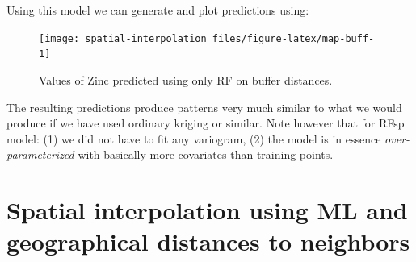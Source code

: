 \documentclass[
  graybox,natbib,nospthms]{svmono}
\newenvironment{Shaded}{\begin{snugshade}}{\end{snugshade}}
\newcommand{\AttributeTok}[1]{\textcolor[rgb]{0.61,0.61,0.61}{#1}}
\newcommand{\ConstantTok}[1]{\textcolor[rgb]{0,0,0}{#1}}
\newcommand{\DecValTok}[1]{\textcolor[rgb]{0.06,0.06,0.06}{#1}}
\newcommand{\FunctionTok}[1]{\textcolor[rgb]{0,0,0}{#1}}
\newcommand{\NormalTok}[1]{#1}
\newcommand{\OtherTok}[1]{\textcolor[rgb]{0.37,0.37,0.37}{#1}}
\newcommand{\SpecialCharTok}[1]{\textcolor[rgb]{0,0,0}{#1}}
\newcommand{\StringTok}[1]{\textcolor[rgb]{0.5,0.5,0.5}{#1}}
\begin{document}
Using this model we can generate and plot predictions using:

\begin{Shaded}
\end{Shaded}

\begin{figure}

{\centering \texttt{[image: spatial-interpolation\_files/figure-latex/map-buff-1]} 

}

\caption{Values of Zinc predicted using only RF on buffer distances.}\label{fig:map-buff}
\end{figure}

The resulting predictions produce patterns very much similar to what we would
produce if we have used ordinary kriging or similar. Note however that for RFsp
model: (1) we did not have to fit any variogram, (2) the model is in essence \emph{over-
parameterized} with basically more covariates than training points.

\hypertarget{spatial-interpolation-using-ml-and-geographical-distances-to-neighbors}{%
\section{Spatial interpolation using ML and geographical distances to neighbors}\label{spatial-interpolation-using-ml-and-geographical-distances-to-neighbors}}
\end{document}
